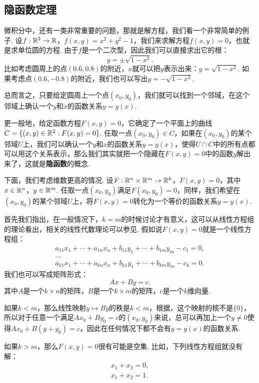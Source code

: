 \subsection{隐函数定理}

微积分中，还有一类非常重要的问题，那就是解方程，我们看一个非常简单的例子. 设$f:\mathbb{R}^2\to\mathbb{R}$，$f(x,y)=x^2+y^2-1$，我们来求解方程$f(x,y)=0$，也就是求单位圆的方程. 由于$f$是一个二次型，因此我们可以直接求出它的根：
    \[y=\pm\sqrt{1-x^2}.\]
比如考虑圆周上的点$(0.6,0.8)$的附近，$x$就可以把$y$表示出来：$y=\sqrt{1-x^2}$. 如果考虑点$(0.6,-0.8)$的附近，我们也可以写出$y=-\sqrt{1-x^2}$. 
    
总而言之，只要给定圆周上一个点$(x_0,y_0)$，我们就可以找到一个邻域，在这个邻域上确认一个$y$和$x$的函数关系$y=y(x)$.

更一般地，给定函数方程$F(x,y)=0$，它确定了一个平面上的曲线$C=\{(x,y)\in\mathbb{R}^2:F(x,y)=0\}$. 任取一点$(x_0,y_0)\in C$，如果在$(x_0,y_0)$的某个邻域$U$上，我们可以确认一个$y$和$x$的函数关系$y=y(x)$，使得$U\cap C$中的所有点都可以用这个关系表示，那么我们其实就把一个隐藏在$F(x,y)=0$中的函数$y$解出来了，这就是\textbf{隐函数}的概念.

下面，我们考虑维数更高的情况. 设$F:\mathbb{R}^n\times\mathbb{R}^m\to\mathbb{R}^k$，$F(x,y)=0$，其中$x\in\mathbb{R}^n$，$y\in\mathbb{R}^m$. 任取一点$(x_0,y_0)$满足$F(x_0,y_0)=0$，同样，我们希望在$(x_0,y_0)$的某个邻域$U$上，将$F(x,y)=0$转化为一个等价的函数关系$y=y(x)$. 

首先我们指出，在一般情况下，$k=m$的时候讨论才有意义，这可以从线性方程组的理论看出，相关的线性代数理论可以参见. 假如说$F(x,y)=0$就是一个线性方程组：
\begin{equation}
    \begin{gathered}
        a_{11}x_1+\cdots+a_{1n}x_n+b_{11}y_1+\cdots+b_{1m}y_m-c_1=0, \\
        \dots \\
        a_{k1}x_1+\cdots+a_{kn}x_n+b_{k1}y_1+\cdots+b_{km}y_m-c_k=0.
    \end{gathered}
    \label{eq:linear-equation}
\end{equation}
我们也可以写成矩阵形式：
\[Ax+By=c.\]
其中$A$是一个$k\times n$的矩阵，$B$是一个$k\times m$的矩阵，$c$是一个$k$维向量.

如果$k<m$，那么线性映射$y\mapsto By$的秩是$k<m$，根据，这个映射的核不是$\{0\}$，所以对于任意一个满足$Ax_0+By_0=c$的$(x_0,y_0)$来说，总可以再加上一个$y\neq 0$使得$Ax_0+B(y+y_0)=c$，因此在任何情况下都不会有$y=y(x)$的函数关系.

如果$k>m$，那么$F(x,y)=0$很有可能是空集. 比如，下列线性方程组就没有解：
\begin{gather*}
    x_1+x_2=0, \\
    x_1+x_2=1.
\end{gather*}

